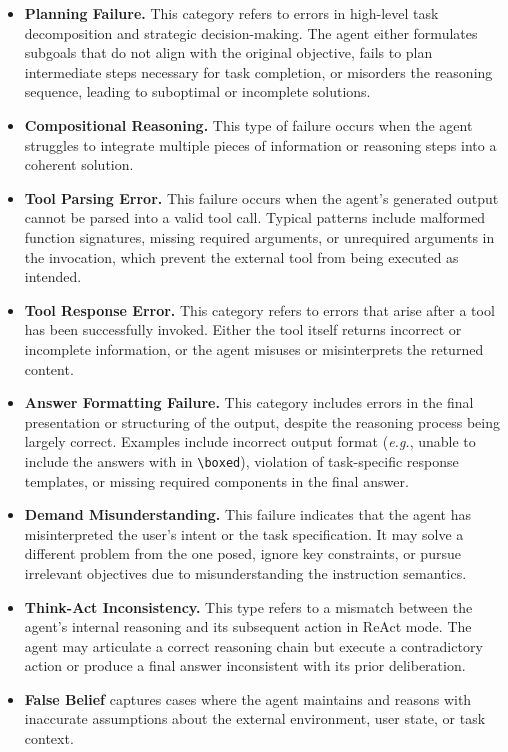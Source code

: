 \documentclass[]{fairmeta}
\begin{document}
\begin{itemize}[leftmargin=*,itemsep=0.2em]

    \item \textbf{Planning Failure.}  
    This category refers to errors in high-level task decomposition and strategic decision-making. The agent either formulates subgoals that do not align with the original objective, fails to plan intermediate steps necessary for task completion, or misorders the reasoning sequence, leading to suboptimal or incomplete solutions.

    \item \textbf{Compositional Reasoning.}  
    This type of failure occurs when the agent struggles to integrate multiple pieces of information or reasoning steps into a coherent solution.
    
    \item \textbf{Tool Parsing Error.}  
    This failure occurs when the agent’s generated output cannot be parsed into a valid tool call. Typical patterns include malformed function signatures, missing required arguments, or unrequired arguments in the invocation, which prevent the external tool from being executed as intended.
    
    \item \textbf{Tool Response Error.}  
    This category refers to errors that arise after a tool has been successfully invoked. Either the tool itself returns incorrect or incomplete information, or the agent misuses or misinterprets the returned content.


    \item \textbf{Answer Formatting Failure.}  
    This category includes errors in the final presentation or structuring of the output, despite the reasoning process being largely correct. Examples include incorrect output format (\textit{e.g.}, unable to include the answers with in \texttt{\textbackslash boxed{}}), violation of task-specific response templates, or missing required components in the final answer.

    \item \textbf{Demand Misunderstanding.}  
    This failure indicates that the agent has misinterpreted the user’s intent or the task specification. It may solve a different problem from the one posed, ignore key constraints, or pursue irrelevant objectives due to misunderstanding the instruction semantics.

    \item \textbf{Think-Act Inconsistency.}  
    This type refers to a mismatch between the agent’s internal reasoning and its subsequent action in ReAct mode. The agent may articulate a correct reasoning chain but execute a contradictory action or produce a final answer inconsistent with its prior deliberation.

    \item \textbf{False Belief} captures cases where the agent maintains and reasons with inaccurate assumptions about the external environment, user state, or task context.
\end{itemize}
\end{document}
